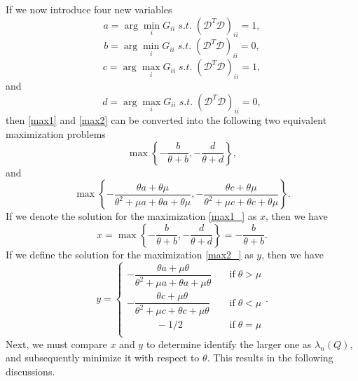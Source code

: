 \documentclass[letterpaper]{article} %
\begin{document}
If we now introduce four new variables
\begin{equation*}
a = \arg \min_i G_{ii} \; s.t. \; (\mathcal{D}^T\mathcal{D})_{ii} = 1,
\end{equation*}
\begin{equation*}
b = \arg \min_i G_{ii} \; s.t. \; (\mathcal{D}^T\mathcal{D})_{ii} = 0,
\end{equation*}
\begin{equation*}
c = \arg \max_i G_{ii} \; s.t. \; (\mathcal{D}^T\mathcal{D})_{ii} = 1,
\end{equation*}
and 
\begin{equation*}
d = \arg \max_i G_{ii} \; s.t. \; (\mathcal{D}^T\mathcal{D})_{ii} = 0,
\end{equation*}
then \eqref{max1} and \eqref{max2} can be converted into the following two equivalent maximization problems
\begin{equation} \label{max1_}
    \max \left \{ -\frac{ b}{\theta+ b}, - \frac{d}{\theta + d}\right\} ,
\end{equation}
and
\begin{equation} \label{max2_}
    \max \left \{ -\frac{\theta a +\theta\mu }{\theta^2+\mu a+\theta a +\theta\mu }, -\frac{\theta c +\theta\mu }{\theta^2+\mu c+\theta c +\theta\mu }  \right\}.
\end{equation}
If we denote the solution for the maximization \eqref{max1_} as $x$, then we have
\begin{equation*} \label{x}
    x =  \max \left \{ -\frac{ b}{\theta+ b}, - \frac{d}{\theta + d}\right\}  =  -\frac{ b}{\theta+ b}. 
\end{equation*}
If we define the solution for the maximization \eqref{max2_} as $y$, then we have
\begin{equation*} \label{y}
    y = \begin{cases}
  		-\dfrac{\theta a+\mu\theta}{\theta^2+\mu a+\theta a+\mu\theta}\quad & \text{if}\;\theta> \mu    \\
  		-\dfrac{\theta c+\mu\theta}{\theta^2+\mu c+\theta c+\mu\theta}\quad & \text{if}\;\theta<\mu \\
            \qquad \quad -1/2\quad & \text{if}\;\theta=\mu \\
  	\end{cases}.
\end{equation*}
Next, we must compare $x$ and $y$ to determine identify the larger one as $\lambda_n(Q)$, and subsequently minimize it with respect to $\theta$. This results in the following discussions. 
\end{document}
